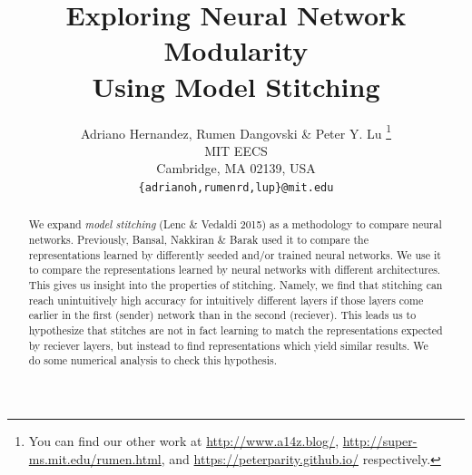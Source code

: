 \documentclass{article} %
\title{Exploring Neural Network Modularity \\ Using Model Stitching}
\author{Adriano Hernandez, Rumen Dangovski \& Peter Y. Lu \thanks{You can find our other work at \url{http://www.a14z.blog/}, \url{http://super-ms.mit.edu/rumen.html}, and \url{https://peterparity.github.io/} respectively.} \\
MIT EECS\\
Cambridge, MA 02139, USA \\
\texttt{\{adrianoh,rumenrd,lup\}@mit.edu}
}
\begin{document}
\maketitle

\begin{abstract}
We expand \textit{model stitching} (Lenc \& Vedaldi 2015) as a methodology to compare neural networks.
Previously, Bansal, Nakkiran \& Barak used it to compare the representations learned by differently seeded and/or trained neural networks.
We use it to compare the representations learned by neural networks with different architectures.
This gives us insight into the properties of stitching. Namely, we find that stitching can reach unintuitively
high accuracy for intuitively different layers if those layers come earlier in the first (sender) network than in
the second (reciever). This leads us to hypothesize that stitches are not in fact learning to match the
representations expected by reciever layers, but instead to find representations which yield similar results.
We do some numerical analysis to check this hypothesis.
\end{abstract}
\end{document}
